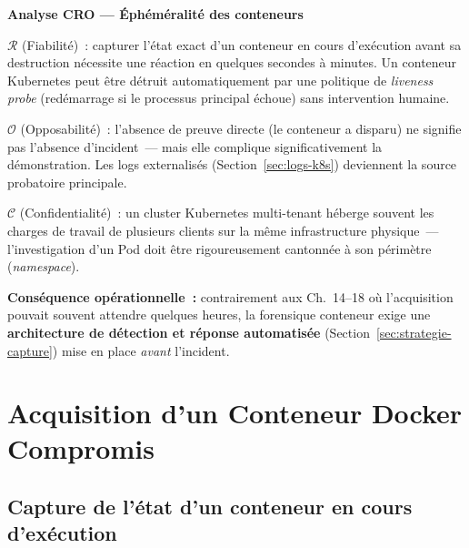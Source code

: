 \begin{boxCRO}
\textbf{Analyse CRO --- Éphéméralité des conteneurs}

$\mathcal{R}$ (Fiabilité)~: capturer l'état exact d'un conteneur
en cours d'exécution avant sa destruction nécessite une réaction
en quelques secondes à minutes. Un conteneur Kubernetes peut être
détruit automatiquement par une politique de \textit{liveness probe}
(redémarrage si le processus principal échoue) sans intervention
humaine.

$\mathcal{O}$ (Opposabilité)~: l'absence de preuve directe (le
conteneur a disparu) ne signifie pas l'absence d'incident~--- mais
elle complique significativement la démonstration. Les logs
externalisés (Section~\ref{sec:logs-k8s}) deviennent la source
probatoire principale.

$\mathcal{C}$ (Confidentialité)~: un cluster Kubernetes multi-tenant
héberge souvent les charges de travail de plusieurs clients sur
la même infrastructure physique~--- l'investigation d'un Pod doit
être rigoureusement cantonnée à son périmètre (\textit{namespace}).


\textbf{Conséquence opérationnelle~:} contrairement aux Ch.~14--18
où l'acquisition pouvait souvent attendre quelques heures, la
forensique conteneur exige une \textbf{architecture de détection
et réponse automatisée} (Section~\ref{sec:strategie-capture})
mise en place \emph{avant} l'incident.
\end{boxCRO}

\section{Acquisition d'un Conteneur Docker Compromis}
\label{sec:acquisition-docker}

\subsection{Capture de l'état d'un conteneur en cours d'exécution}

